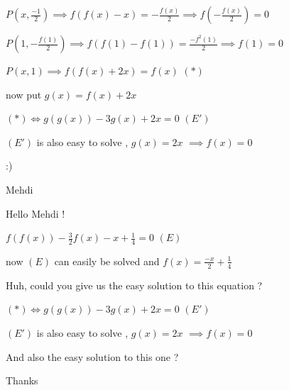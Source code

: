 \begin{solution}
$ P(x,\frac{-1}{2})\implies f(f(x)-x)=-\frac{f(x)}{2}\implies f(-\frac{f(x)}{2})=0$

$ P(1,-\frac{f(1)}{2})\implies f(f(1)-f(1))=\frac{-f^2(1)}{2}\implies f(1)=0$

$ P(x,1)\implies f(f(x)+2x)=f(x)$ $ (*)$

now put $ g(x)=f(x)+2x$

$ (*)\iff g(g(x))-3g(x)+2x=0$   $ (E')$

$ (E')$ is also easy to solve , $ g(x)=2x$ $ \implies f(x)=0$

:)

Mehdi
\end{solution}



\begin{solution}
	Hello Mehdi !

\begin{tcolorbox} $ \boxed{f(f(x)) - \frac {3}{2}f(x) - x + \frac 14 = 0}$  $ (E)$

now $ (E)$ can easily be solved  and $ f(x) = \frac { - x}{2} + \frac {1}{4}$\end{tcolorbox}

Huh, could you give us the easy solution to this equation ?




\begin{tcolorbox} $ (*)\iff g(g(x)) - 3g(x) + 2x = 0$   $ (E')$

$ (E')$ is also easy to solve , $ g(x) = 2x$ $ \implies f(x) = 0$\end{tcolorbox}

And also the easy solution to this one ?

Thanks
\end{solution}







